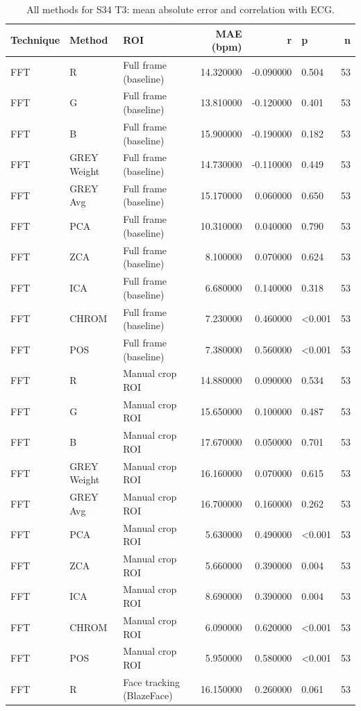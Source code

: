\begin{table}[htbp]
\centering
\caption{All methods for S34 T3: mean absolute error and correlation with ECG.}
\label{tab:spread_s34_t3}
\begin{tabular}{l l l r r l r}
\toprule
Technique & Method & ROI & MAE (bpm) & r & p & n \\
\midrule
FFT & R & Full frame (baseline) & 14.320000 & -0.090000 & 0.504 & 53 \\
FFT & G & Full frame (baseline) & 13.810000 & -0.120000 & 0.401 & 53 \\
FFT & B & Full frame (baseline) & 15.900000 & -0.190000 & 0.182 & 53 \\
FFT & GREY Weight & Full frame (baseline) & 14.730000 & -0.110000 & 0.449 & 53 \\
FFT & GREY Avg & Full frame (baseline) & 15.170000 & 0.060000 & 0.650 & 53 \\
FFT & PCA & Full frame (baseline) & 10.310000 & 0.040000 & 0.790 & 53 \\
FFT & ZCA & Full frame (baseline) & 8.100000 & 0.070000 & 0.624 & 53 \\
FFT & ICA & Full frame (baseline) & 6.680000 & 0.140000 & 0.318 & 53 \\
FFT & CHROM & Full frame (baseline) & 7.230000 & 0.460000 & <0.001 & 53 \\
FFT & POS & Full frame (baseline) & 7.380000 & 0.560000 & <0.001 & 53 \\
FFT & R & Manual crop ROI & 14.880000 & 0.090000 & 0.534 & 53 \\
FFT & G & Manual crop ROI & 15.650000 & 0.100000 & 0.487 & 53 \\
FFT & B & Manual crop ROI & 17.670000 & 0.050000 & 0.701 & 53 \\
FFT & GREY Weight & Manual crop ROI & 16.160000 & 0.070000 & 0.615 & 53 \\
FFT & GREY Avg & Manual crop ROI & 16.700000 & 0.160000 & 0.262 & 53 \\
FFT & PCA & Manual crop ROI & 5.630000 & 0.490000 & <0.001 & 53 \\
FFT & ZCA & Manual crop ROI & 5.660000 & 0.390000 & 0.004 & 53 \\
FFT & ICA & Manual crop ROI & 8.690000 & 0.390000 & 0.004 & 53 \\
FFT & CHROM & Manual crop ROI & 6.090000 & 0.620000 & <0.001 & 53 \\
FFT & POS & Manual crop ROI & 5.950000 & 0.580000 & <0.001 & 53 \\
FFT & R & Face tracking (BlazeFace) & 16.150000 & 0.260000 & 0.061 & 53 \\

\end{tabular}
\end{table}
